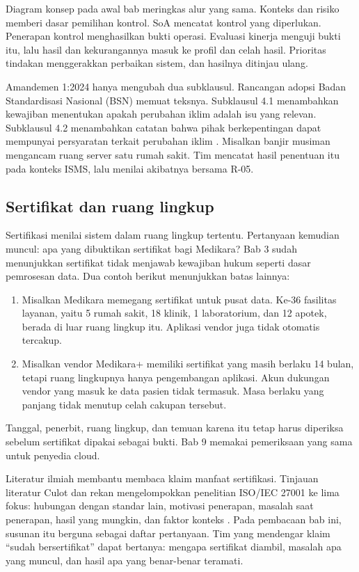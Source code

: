 Diagram konsep pada awal bab meringkas alur yang sama. Konteks dan risiko memberi dasar pemilihan
kontrol. SoA mencatat kontrol yang diperlukan. Penerapan kontrol menghasilkan bukti operasi. Evaluasi
kinerja menguji bukti itu, lalu hasil dan kekurangannya masuk ke profil dan celah hasil. Prioritas
tindakan menggerakkan perbaikan sistem, dan hasilnya ditinjau ulang.

Amandemen 1:2024 hanya mengubah dua subklausul. Rancangan adopsi Badan Standardisasi Nasional (BSN)
memuat teksnya. Subklausul 4.1 menambahkan kewajiban menentukan apakah perubahan iklim adalah isu
yang relevan. Subklausul 4.2 menambahkan catatan bahwa pihak berkepentingan dapat mempunyai
persyaratan terkait perubahan iklim \cite{c06-bsn-amd1}. Misalkan banjir musiman mengancam ruang
server satu rumah sakit. Tim mencatat hasil penentuan itu pada konteks ISMS, lalu menilai akibatnya
bersama R-05.

\subsection*{Sertifikat dan ruang lingkup}

Sertifikasi menilai sistem dalam ruang lingkup tertentu. Pertanyaan kemudian muncul: apa yang
dibuktikan sertifikat bagi Medikara? Bab 3 sudah menunjukkan sertifikat tidak menjawab kewajiban
hukum seperti dasar pemrosesan data. Dua contoh berikut menunjukkan batas lainnya:
\begin{enumerate}
  \item Misalkan Medikara memegang sertifikat untuk pusat data. Ke-36 fasilitas layanan, yaitu 5
  rumah sakit, 18 klinik, 1 laboratorium, dan 12 apotek, berada di luar ruang lingkup itu. Aplikasi
  vendor juga tidak otomatis tercakup.
  \item Misalkan vendor Medikara+ memiliki sertifikat yang masih berlaku 14 bulan, tetapi ruang
  lingkupnya hanya pengembangan aplikasi. Akun dukungan vendor yang masuk ke data pasien tidak
  termasuk. Masa berlaku yang panjang tidak menutup celah cakupan tersebut.
\end{enumerate}

Tanggal, penerbit, ruang lingkup, dan temuan karena itu tetap harus diperiksa sebelum sertifikat
dipakai sebagai bukti. Bab 9 memakai pemeriksaan yang sama untuk penyedia cloud.

Literatur ilmiah membantu membaca klaim manfaat sertifikasi. Tinjauan literatur Culot dan rekan
mengelompokkan penelitian ISO/IEC 27001 ke lima fokus: hubungan dengan standar lain, motivasi
penerapan, masalah saat penerapan, hasil yang mungkin, dan faktor konteks \cite{c06-culot2021}. Pada
pembacaan bab ini, susunan itu berguna sebagai daftar pertanyaan. Tim yang mendengar klaim ``sudah
bersertifikat'' dapat bertanya: mengapa sertifikat diambil, masalah apa yang muncul, dan hasil apa
yang benar-benar teramati.


